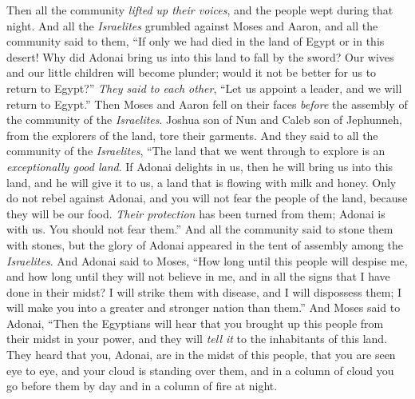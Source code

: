 \begin{biblechapter} %
 Then all the community \textit{lifted up their voices}, and the people wept during that night.
\verse And all the \textit{Israelites} grumbled against Moses and Aaron, and all the community said to them, “If only we had died in the land of Egypt or in this desert!
\verse Why did Adonai bring us into this land to fall by the sword? Our wives and our little children will become plunder; would it not be better for us to return to Egypt?”
\verse \textit{They said to each other}, “Let us appoint a leader, and we will return to Egypt.”
\verse Then Moses and Aaron fell on their faces \textit{before} the assembly of the community of the \textit{Israelites}.
\verse Joshua son of Nun and Caleb son of Jephunneh, from the explorers of the land, tore their garments.
\verse And they said to all the community of the \textit{Israelites}, “The land that we went through to explore is an \textit{exceptionally good land}.
\verse If Adonai delights in us, then he will bring us into this land, and he will give it to us, a land that is flowing with milk and honey.
\verse Only do not rebel against Adonai, and you will not fear the people of the land, because they will be our food. \textit{Their protection} has been turned from them; Adonai is with us. You should not fear them.”
\verse And all the community said to stone them with stones, but the glory of Adonai appeared in the tent of assembly among the \textit{Israelites}.
\verse And Adonai said to Moses, “How long until this people will despise me, and how long until they will not believe in me, and in all the signs that I have done in their midst?
\verse I will strike them with disease, and I will dispossess them; I will make you into a greater and stronger nation than them.”
\verse And Moses said to Adonai, “Then the Egyptians will hear that you brought up this people from their midst in your power,
\verse and they will \textit{tell it} to the inhabitants of this land. They heard that you, Adonai, are in the midst of this people, that you are seen eye to eye, and your cloud is standing over them, and in a column of cloud you go before them by day and in a column of fire at night.

\end{biblechapter}
